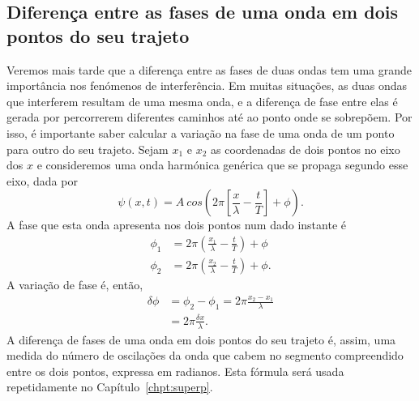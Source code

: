 \subsection{Diferença entre as fases de uma onda em dois pontos do seu trajeto}
\label{sec:dfidx}
Veremos mais tarde que a diferença entre as fases de duas ondas tem uma grande
importância nos fenómenos de interferência.  Em muitas situações, as duas ondas
que interferem resultam de uma mesma onda, e a diferença de fase entre elas é
gerada por percorrerem diferentes caminhos até ao ponto onde se sobrepõem.  Por
isso, é importante saber calcular a variação na fase de uma onda de um ponto
para outro do seu trajeto.  Sejam $x_1$ e $x_2$ as coordenadas de dois pontos no
eixo dos $x$ e consideremos uma onda harmónica genérica que se propaga segundo
esse eixo, dada por
\begin{equation*}
\psi(x,t)=A\
    cos\left(2\pi\left[\frac{x}{\lambda}-\frac{t}{T}\right]+\phi\right).
\end{equation*}
A fase que esta onda apresenta nos dois pontos num dado instante é
\begin{align*}
\phi_1&=2\pi\left(\frac{x_1}{\lambda}-\frac{t}{T}\right)+\phi\\
\phi_2&=2\pi\left(\frac{x_2}{\lambda}-\frac{t}{T}\right)+\phi.
\end{align*}
A variação de fase é, então,
\begin{align}
  \delta\phi&=\phi_2-\phi_1=2\pi\frac{x_2-x_1}{\lambda}\nonumber\\
            &= 2\pi\frac{\delta x}{\lambda}.\label{eq:deltaphix}
\end{align}
A diferença de fases de uma onda em dois pontos do seu trajeto é, assim, uma
medida do número de oscilações da onda que cabem no segmento compreendido entre
os dois pontos, expressa em radianos.  Esta fórmula será usada repetidamente no
Capítulo~\ref{chpt:superp}.



